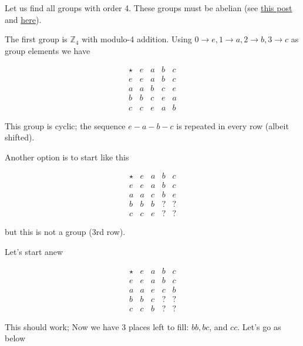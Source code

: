 
Let us find all groups with order 4. These groups must be abelian (see
\href{\%7Bfilename\%7D2016-10-19_non_abelian_group_order.markdown}{this
post} and
\href{http://math.stackexchange.com/questions/300393/group-tables-for-a-group-of-four-elements}{here}).

The first group is \(\mathbb{Z}_4\) with modulo-4 addition. Using
\(0 \rightarrow e,1 \rightarrow a,2 \rightarrow b,3 \rightarrow c\) as
group elements we have

\[
\begin{array}{c|cccc}
\star   & e     & a    & b   & c     \\
\hline
e       & e     & a    & b   & c     \\
a       & a     & b    & c   & e     \\
b       & b     & c    & e   & a     \\
c       & c     & e    & a   & b
\end{array}
\]

This group is cyclic; the sequence \(e-a-b-c\) is repeated in every row
(albeit shifted).

Another option is to start like this

\[
\begin{array}{c|cccc}
\star   & e     & a    & b   & c     \\
\hline
e       & e     & a    & b   & c     \\
a       & a     & c    & b   & e     \\
b       & b     & b    & ?   & ?     \\
c       & c     & e    & ?   & ?
\end{array}
\]

but this is not a group (3rd row).

Let's start anew

\[
\begin{array}{c|cccc}
\star   & e     & a    & b   & c     \\
\hline
e       & e     & a    & b   & c     \\
a       & a     & e    & c   & b     \\
b       & b     & c    & ?   & ?     \\
c       & c     & b    & ?   & ?
\end{array}
\]

This should work; Now we have 3 places left to fill: \(bb, bc\), and
\(cc\). Let's go as below

